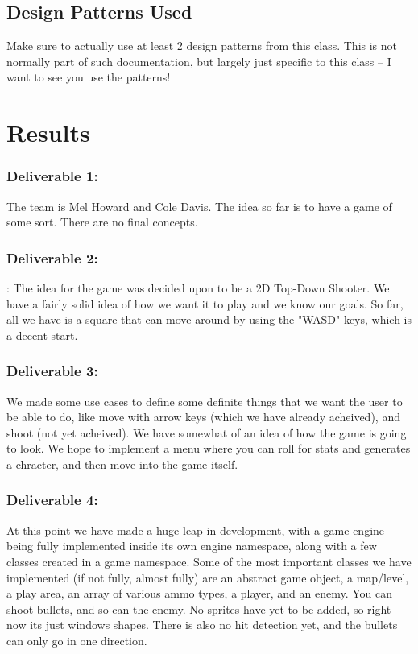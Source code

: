 \documentclass[10pt,conference,onecolumn,compsoc]{IEEEtran}
\begin{document}
\subsection{Design Patterns Used}
Make sure to actually use at least 2 design patterns from this class.  This is not normally part of such documentation, but largely just specific to this class -- I want to see you use the patterns!


\section{Results}
\subsubsection*{Deliverable 1:}The team is Mel Howard and Cole Davis. 
The idea so far is to 
have a game of some sort. There are no final concepts.

\subsubsection*{Deliverable 2:}: The idea for the game was decided upon 
to be a 2D Top-Down 
Shooter. We have a fairly solid idea of how we want it to
play and we know our goals. So far, all we have is a square that can move 
around by using the "WASD" keys, which is a decent start.

\subsubsection*{Deliverable 3:} We made some use cases to define some 
definite things that 
we want the user to be able to do, like move with arrow keys
(which we have already acheived), and shoot (not yet acheived). We have 
somewhat of an idea of how the game is going to look. We hope to
implement a menu where you can roll for stats and generates a chracter, and 
then move into the game itself.

\subsubsection*{Deliverable 4:} At this point we have made a huge leap in 
development, with 
a game engine being fully implemented inside its own engine
namespace, along with a few classes created in a game namespace. Some of 
the most important classes we have implemented (if not fully,
almost fully) are an abstract game object, a map/level, a play area, an array 
of various ammo types, a player, and an enemy. You can shoot
bullets, and so can the enemy. No sprites have yet to be added, so right now 
its just windows shapes. There is also no hit detection yet,
and the bullets can only go in one direction.
\end{document}
